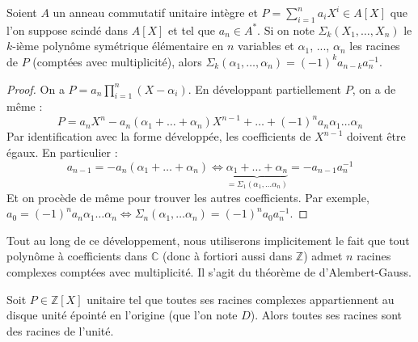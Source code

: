





  \begin{lemma}
    \label{theoreme-de-kronecker-1}
    Soient $A$ un anneau commutatif unitaire intègre et $P = \sum_{i=1}^n a_iX^i \in A[X]$ que l'on suppose scindé dans $A[X]$ et tel que $a_n \in A^*$. Si on note $\Sigma_k(X_1, \dots, X_n)$ le $k$-ième polynôme symétrique élémentaire en $n$ variables et $\alpha_1$, ..., $\alpha_n$ les racines de $P$ (comptées avec multiplicité), alors $\Sigma_k(\alpha_1, \dots, \alpha_n) = (-1)^k a_{n-k} a_n^{-1}$.
  \end{lemma}

  \begin{proof}
    On a $P = a_n \prod_{i=1}^n (X-\alpha_i)$. En développant partiellement $P$, on a de même :
    \[ P = a_n X^n - a_n (\alpha_1 + \dots + \alpha_n)X^{n-1} + \dots + (-1)^n a_n \alpha_1 \dots \alpha_n \]
    Par identification avec la forme développée, les coefficients de $X^{n-1}$ doivent être égaux. En particulier :
    \[ a_{n-1} = -a_n (\alpha_1 + \dots + \alpha_n) \iff \underbrace{\alpha_1 + \dots + \alpha_n}_{= \Sigma_1(\alpha_1, \dots \alpha_n)} = - a_{n-1} a_n^{-1} \]
    Et on procède de même pour trouver les autres coefficients. Par exemple, $a_0 = (-1)^n a_n \alpha_1 \dots \alpha_n \iff \Sigma_n(\alpha_1, \dots \alpha_n) = (-1)^n a_0 a_n^{-1}$.
  \end{proof}

  \begin{remark}
    Tout au long de ce développement, nous utiliserons implicitement le fait que tout polynôme à coefficients dans $\mathbb{C}$ (donc à fortiori aussi dans $\mathbb{Z}$) admet $n$ racines complexes comptées avec multiplicité. Il s'agit du théorème de d'Alembert-Gauss.
  \end{remark}


  \begin{theorem}[Kronecker]
    \label{theoreme-de-kronecker-2}
    Soit $P \in \mathbb{Z}[X]$ unitaire tel que toutes ses racines complexes appartiennent au disque unité épointé en l'origine (que l'on note $D$). Alors toutes ses racines sont des racines de l'unité.
  \end{theorem}

